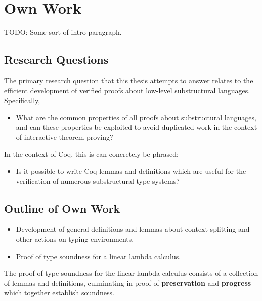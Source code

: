 \documentclass[]{unswthesis}
\begin{document}
\chapter{Own Work}

TODO: Some sort of intro paragraph.

\section{Research Questions}

The primary research question that this thesis attempts to answer relates to the efficient development of verified proofs about low-level substructural languages. Specifically,

\begin{itemize}
\item What are the common properties of all proofs about substructural languages, and can these properties be exploited to avoid duplicated work in the context of interactive theorem proving?
\end{itemize}

In the context of Coq, this is can concretely be phrased:

\begin{itemize}
\item Is it possible to write Coq lemmas and definitions which are useful for the verification of numerous substructural type systems?
\end{itemize}



\section{Outline of Own Work}

\begin{itemize}
\item Development of general definitions and lemmas about context splitting and other actions on typing environments.
\item Proof of type soundness for a linear lambda calculus.
\end{itemize}

The proof of type soundness for the linear lambda calculus consists of a collection of lemmas and definitions, culminating in proof of \textbf{preservation} and \textbf{progress} which together establish soundness.
\end{document}

